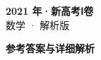 \documentclass[zihao=-4, a4paper]{ctexart}
\begin{document}
\begin{center}
  {\Large\bfseries 2021 年·新高考Ⅰ卷}\\[4pt]
  {\large 数学 · 解析版}
\end{center}
\medskip
{}

\clearpage
{}
\begin{center}{\Large\bfseries 参考答案与详细解析}\end{center}
\medskip

\end{document}
